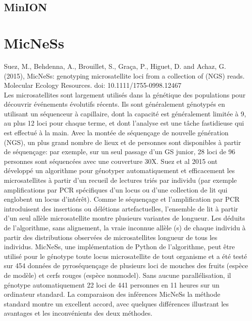 \documentclass[a4paper]{article}
\begin{document}
\subsection{MinION}



\section{MicNeSs}

Suez, M., Behdenna, A., Brouillet, S., Graça, P., Higuet, D. and Achaz, G. (2015), MicNeSs: genotyping microsatellite loci from a collection of (NGS) reads. Molecular Ecology Resources. doi: 10.1111/1755-0998.12467
~~\\
Les microsatellites sont largement utilisés dans la génétique des populations pour découvrir événements évolutifs récents. Ils sont généralement génotypés en utilisant un séquenceur à capillaire, dont la capacité est généralement limitée à 9, au plus 12 loci pour chaque terme, et dont l'analyse est une tâche fastidieuse qui est effectué à la main. Avec la montée de séquençage de nouvelle génération (NGS), un plus grand nombre de lieux et de personnes sont disponibles à partir de séquençage: par exemple, sur un seul passage d'un GS junior, 28 loci de 96 personnes sont séquencées avec une couverture 30X. Suez et al 2015 ont développé un algorithme pour génotyper automatiquement et efficacement les microsatellites à partir d'un recueil de lectures triés par individu (par exemple amplifications par PCR spécifiques d'un locus ou d'une collection de lit qui englobent un locus d'intérêt). Comme le séquençage et l'amplification par PCR introduisent des insertions ou délétions artefactuelles, l'ensemble de lit à partir d'un seul allèle microsatellite montre plusieurs variantes de longueur. Les déduits de l'algorithme, sans alignement, la vraie inconnue allèle (s) de chaque individu à partir des distributions observées de microsatellites longueur de tous les individus. MicNeSs, une implémentation de Python de l'algorithme, peut être utilisé pour le génotype toute locus microsatellite de tout organisme et a été testé sur 454 données de pyroséquençage de plusieurs loci de mouches des fruits (espèce de modèle) et cerfs rouges (espèce nonmodel). Sans aucune parallélisation, il génotype automatiquement 22 loci de 441 personnes en 11 heures sur un ordinateur standard. La comparaison des inférences MicNeSs la méthode standard montre un excellent accord, avec quelques différences illustrant les avantages et les inconvénients des deux méthodes.
\end{document}
